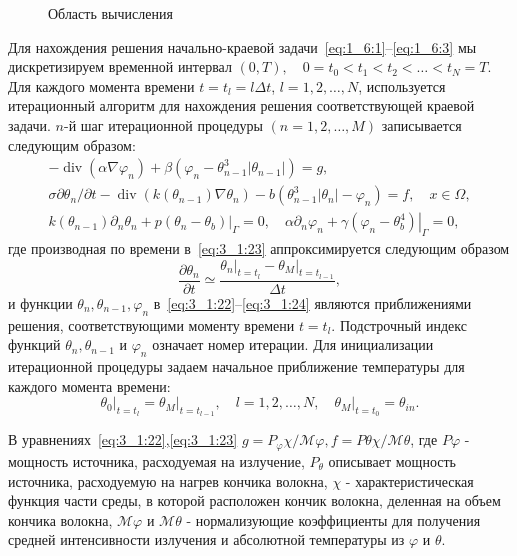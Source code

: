 \begin{figure}[ht]
    \caption{Область вычисления}
    \label{fig:4_3:3}
\end{figure}
Для нахождения решения начально-краевой
задачи~\eqref{eq:1_6:1}--\eqref{eq:1_6:3}
мы дискретизируем временной интервал
$(0, T), \quad 0=t_{0}<t_{1}<t_{2}<\ldots<t_{N}=T$.
Для каждого момента времени $t=t_{l}=l \Delta t$, $l=1,2, \ldots, N$,
используется итерационный алгоритм для нахождения решения соответствующей
краевой задачи. $n$-й шаг итерационной процедуры $(n=1,2, \ldots, M)$
записывается следующим образом:
\begin{gather}
    -\operatorname{div}\left(\alpha \nabla \varphi_{n}\right)
    +\beta\left(\varphi_{n}-\theta_{n-1}^{3}
    \left|\theta_{n-1}\right|\right)=g, \label{eq:3_1:22}\\
    \sigma \partial \theta_{n} / \partial t
    -\operatorname{div}\left(k\left(\theta_{n-1}\right)
    \nabla \theta_{n}\right)
    -b\left(\theta_{n-1}^{3}\left|\theta_{n}\right|
    -\varphi_{n}\right)=f, \quad x \in \Omega, \label{eq:3_1:23}\\
    k\left(\theta_{n-1}\right) \partial_{n} \theta_{n}
    +\left.p\left(\theta_{n}-\theta_{b}\right)\right|_{\Gamma}=0,
    \quad \alpha \partial_{n} \varphi_{n}+\left.\gamma
    \left(\varphi_{n}-\theta_{b}^{4}\right)\right|_{\Gamma}=0,\label{eq:3_1:24}
\end{gather}
где производная по времени в~\eqref{eq:3_1:23}
аппроксимируется следующим образом
\[
    \frac{\partial \theta_{n}}{\partial t} \simeq
    \frac{
        \left.\theta_{n}\right|_{t=t_{l}}
        -\left.\theta_{M}\right|_{t=t_{l-1}}
    }{\Delta t},
\]
и функции $\theta_{n}, \theta_{n-1}, \varphi_{n}$
в~\eqref{eq:3_1:22}--\eqref{eq:3_1:24} являются приближениями решения,
соответствующими моменту времени $t=t_{l}$.
Подстрочный индекс функций
$\theta_{n}, \theta_{n-1}$ и $\varphi_{n}$ означает номер итерации.
Для инициализации итерационной процедуры задаем начальное приближение
температуры для каждого момента времени:
\begin{equation}
    \label{eq:3_1:25}
    \left.\theta_{0}\right|_{t=t_{l}}=
    \left.\theta_{M}\right|_{t=t_{l-1}},
    \quad l=1,2, \ldots, N, \left.\quad
    \theta_{M}\right|_{t=t_{0}}=\theta_{i n}.
\end{equation}

В уравнениях~\eqref{eq:3_1:22},\eqref{eq:3_1:23}
$g=P_{\varphi} \chi / \mathcal{M}{\varphi},
f=P{\theta} \chi / \mathcal{M}{\theta}$,
где $P{\varphi}$ - мощность источника, расходуемая на излучение,
$P_{\theta}$ описывает мощность источника, расходуемую на нагрев
кончика волокна, $\chi$ - характеристическая функция части среды,
в которой расположен кончик волокна, деленная на объем кончика волокна,
$\mathcal{M}{\varphi}$ и $\mathcal{M}{\theta}$ - нормализующие коэффициенты
для получения средней интенсивности излучения
и абсолютной температуры из $\varphi$ и $\theta$.


